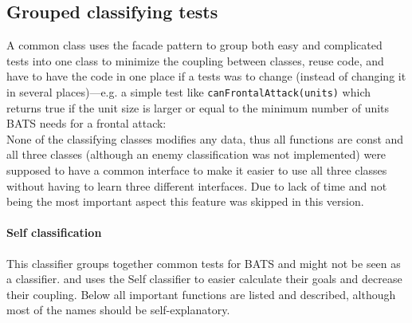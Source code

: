 \subsection{Grouped classifying tests}
A common class uses the facade pattern to group both easy and complicated tests into one class to
minimize the coupling between classes, reuse code, and have to have the code in one place if a tests
was to change (instead of changing it in several places)—e.g. a simple test like
\texttt{canFrontalAttack(units)} which returns true if the unit size is larger or equal to the
minimum number of units BATS needs for a frontal attack:
{\\}
\vspace{0.5em}
None of the classifying classes modifies any data, thus all functions
are const and all three classes (although an enemy classification was not implemented) were supposed to have a
common interface to make it easier to use all three classes without having to learn three different
interfaces. Due to lack of time and not being the most important aspect this feature was skipped in
this version.

\paragraph{Self classification}
This classifier groups together common tests for BATS and might not be seen as a classifier.
 and  uses the Self classifier to easier
calculate their goals and decrease their coupling. Below all important functions are listed and
described, although most of the names should be self-explanatory.

